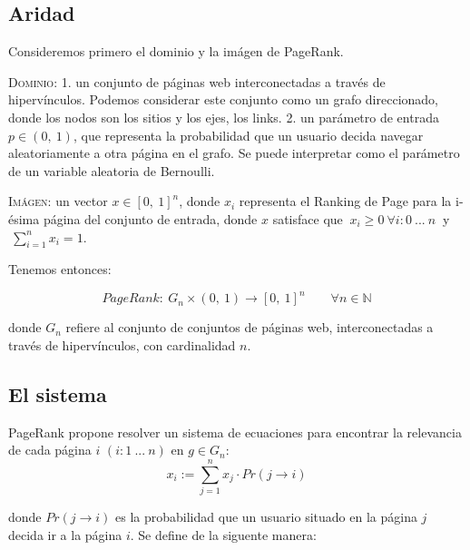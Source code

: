 \vspace{1em}

\subsection{Aridad} Consideremos primero el dominio y la imágen de PageRank. 

\vspace{1em}
\noindent \textsc{Dominio}: \textsc{1.} un conjunto de páginas web interconectadas a través de hipervínculos. Podemos considerar este conjunto como un grafo direccionado, donde los nodos son los sitios y los ejes, los links. \textsc{2.} un parámetro de entrada $p \in (0,\ 1)$, que representa la probabilidad que un usuario decida navegar aleatoriamente a otra página en el grafo. Se puede interpretar como el parámetro de un variable aleatoria de Bernoulli. 

\vspace{1em}
\noindent \textsc{Imágen}: un vector $x \in [0,\ 1]^{n}$, donde $x_i$ representa el Ranking de Page para la i-ésima página del conjunto de entrada, donde $x$ satisface que $\ x_i \geq 0\ \forall i:0\ ...\ n\ $ y $\ \sum_{i=1}^{n}{x_i} = 1$.

\vspace{1em}
\noindent Tenemos entonces:

\begin{equation}
    PageRank:\ G_n \times (0,\ 1) \longrightarrow [0,\ 1]^{n}\qquad \forall n \in \mathbb{N}
\end{equation}

\vspace{1em}
\noindent donde $G_n$ refiere al conjunto de conjuntos de páginas web, interconectadas a través de hipervínculos, con cardinalidad $n$.




\vspace{2em}
\subsection{El sistema} PageRank propone resolver un sistema de ecuaciones para encontrar la relevancia de cada página $i$ $(i: 1\ ...\ n)$ en $g \in G_n$:
\vspace{1em}
\begin{equation}
    x_i := \sum_{j=1}^{n} x_j \cdot Pr(j \longrightarrow i) 
\end{equation}

\vspace{1em}
\noindent donde $Pr(j \longrightarrow i)$ es la probabilidad que un usuario situado en la página $j$ decida ir a la página $i$. Se define de la siguente manera:

